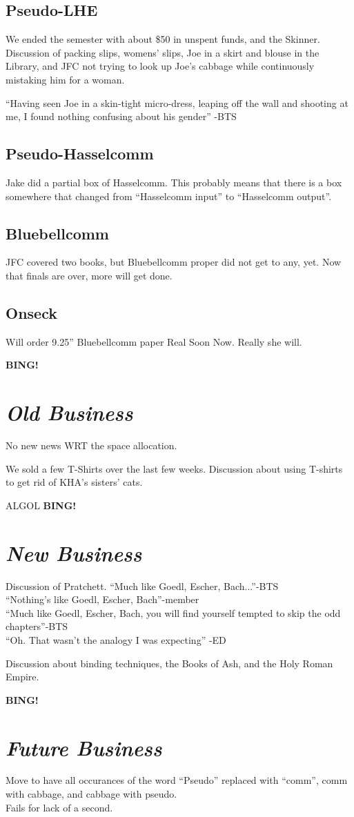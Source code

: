 \documentclass[10pt]{article}
\newcommand{\bing}{{\bf BING!} }
\newcommand{\goto}[1]{\bing \vskip 12pt \section*{{\em{#1}}}}
\begin{document}
\subsection*{Pseudo-LHE}
We ended the semester with about \$50 in unspent funds, and the
Skinner.  Discussion of packing slips, womens' slips, Joe in a skirt
and blouse in the Library, and JFC not trying to look up Joe's cabbage
while continuously mistaking him for a woman.

``Having seen Joe in a skin-tight micro-dress, leaping off the wall and
shooting at me, I found nothing confusing about his gender'' -BTS


\subsection*{Pseudo-Hasselcomm}
Jake did a partial box of Hasselcomm. This probably means that there
is a box somewhere that changed from ``Hasselcomm input'' to
``Hasselcomm output''.

\subsection*{Bluebellcomm}
JFC covered two books, but Bluebellcomm proper did not get to any,
yet. Now that finals are over, more will get done.

\subsection*{Onseck}
Will order 9.25'' Bluebellcomm paper Real Soon Now. Really she will.

\goto{Old Business}
No new news WRT the space allocation. 

We sold a few T-Shirts over the last few weeks.  Discussion about
using T-shirts to get rid of KHA's sisters' cats.

ALGOL
\goto{New Business}
Discussion of Pratchett.
``Much like Goedl, Escher, Bach...''-BTS\\
``Nothing's like Goedl, Escher, Bach''-member\\
``Much like Goedl, Escher, Bach, you will find yourself tempted to
skip the odd chapters''-BTS\\
``Oh. That wasn't the analogy I was expecting'' -ED

Discussion about binding techniques, the Books of Ash, and the Holy
Roman Empire.

\goto{Future Business}

Move to have all occurances of the word ``Pseudo'' replaced with
``comm'', comm with cabbage, and cabbage with pseudo.\\
Fails for lack of a second.
\end{document}

